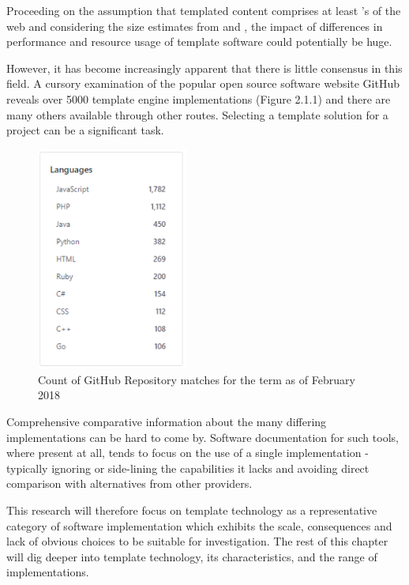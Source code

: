 Proceeding on the assumption that templated content comprises at least \citeauthor{Shao-Hua2008}'s \citeyear{Shao-Hua2008}  of the web and considering the size estimates from \cite{Worldwidewebsize2018} and \cite{Kunder2008}, the impact of differences in performance and resource usage of template software could potentially be huge.

However, it has become increasingly apparent that there is little consensus in this field. A cursory examination of the popular open source software website GitHub reveals over 5000 template engine implementations (Figure 2.1.1) and there are many others available through other routes. Selecting a template solution for a project can be a significant task.

\begin{figure}[ht!]
\centering
\includegraphics[width=50mm]{Figures/github_top.png}
\caption{Count of GitHub Repository matches for the term  as of February 2018}
\end{figure}

Comprehensive comparative information about the many differing implementations can be hard to come by. Software documentation for such tools, where present at all, tends to focus on the use of a single implementation - typically ignoring or side-lining the capabilities it lacks and avoiding direct comparison with alternatives from other providers.

This research will therefore focus on template technology as a representative category of software implementation which exhibits the scale, consequences and lack of obvious choices to be suitable for investigation. The rest of this chapter will dig deeper into template technology, its characteristics, and the range of implementations.

